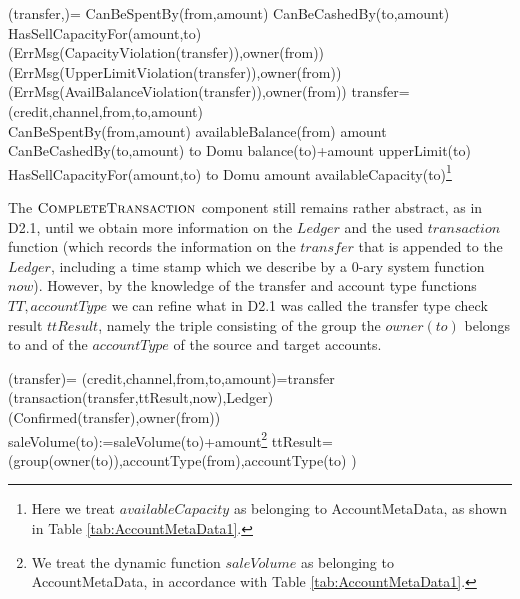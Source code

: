 \begin{asm}
(transfer,)=\+
   \IF CanBeSpentBy(from,amount) \THEN \+
      \IF CanBeCashedBy(to,amount)  \THEN \+
         \IF HasSellCapacityFor(amount,to) \THEN \+
             \-
            \ELSE 
             ~ (ErrMsg(CapacityViolation(transfer)),\TO owner(from))\-
         \ELSE 
         ~ (ErrMsg(UpperLimitViolation(transfer)),\TO owner(from))\-
      \ELSE 
      ~ (ErrMsg(AvailBalanceViolation(transfer)),\TO owner(from))\-
      \WHERE \+
transfer=(credit,channel,from,to,amount)\\
CanBeSpentBy(from,amount) \IFF availableBalance(from) \geq amount \\
CanBeCashedBy(to,amount) \IFF  
    to \not \in Domu \AND balance(to)+amount \leq upperLimit(to) \\
 HasSellCapacityFor(amount,to) \IFF  to \not \in Domu \AND   amount \leq availableCapacity(to)\footnote{Here we treat $availableCapacity$ as belonging to AccountMetaData, as shown in Table \ref{tab:AccountMetaData1}.}
\end{asm}


The $\hbox{\sc CompleteTransaction}$ component still remains rather abstract, as in D2.1, until we obtain more information on the $Ledger$ and the used  $transaction$ function (which records the information on the $transfer$ that is appended to the $Ledger$, including a time stamp which we describe by a 0-ary system function $now$). However, by the knowledge of the transfer and account type functions $TT, accountType$ we can refine what in D2.1 was called the transfer type check result $ttResult$, namely the triple consisting of the group the $owner(to)$ belongs to and of the $accountType$ of the source and target accounts.

\begin{asm}
(transfer)=\+  
\LET (credit,channel,from,to,amount)=transfer \\ 
   (transaction(transfer,ttResult,now),Ledger)\\
   (Confirmed(transfer),\TO owner(from))\\
   saleVolume(to):=saleVolume(to)+amount\footnote{We treat the dynamic function $saleVolume$ as belonging to AccountMetaData, in accordance with Table \ref{tab:AccountMetaData1}.} \-
\WHERE \+
 ttResult= (group(owner(to)),accountType(from),accountType(to) )
\end{asm}

